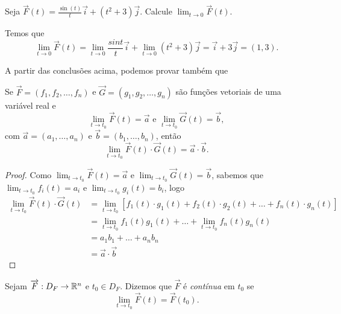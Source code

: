 \begin{example}
    Seja \(\overrightarrow{F}(t) = \frac{\sin(t)}{t}\overrightarrow{i} + (t^2 + 3)\overrightarrow{j}\). Calcule \(\lim_{t\to 0} \overrightarrow{F}(t)\).

    Temos que \[\lim_{t\to 0}\overrightarrow{F}(t) = \lim_{t\to 0} \frac{sin t}{t}\overrightarrow{i} + \lim_{t\to 0} (t^2 + 3)\overrightarrow{j} = \overrightarrow{i} + 3\overrightarrow{j} = (1,3).\]
\end{example}

A partir das conclusões acima, podemos provar também que

\begin{proposition}
    Se \(\overrightarrow{F} = (f_1,f_2,\dots,f_n)\) e \(\overrightarrow{G} = (g_1,g_2,\dots,g_n)\) são funções vetoriais de uma variável real e \[\lim_{t\to t_0} \overrightarrow{F}(t) = \overrightarrow{a} \text{ e } \lim_{t\to t_0} \overrightarrow{G}(t) = \overrightarrow{b},\] com \(\overrightarrow{a} = (a_1,\dots,a_n)\) e \(\overrightarrow{b} = (b_1,\dots,b_n)\), então \[\lim_{t\to t_0} \overrightarrow{F}(t) \cdot \overrightarrow{G}(t) = \overrightarrow{a}\cdot\overrightarrow{b}.\]
\end{proposition}

\begin{proof}
    Como \(\lim_{t\to t_0} \overrightarrow{F}(t) = \overrightarrow{a}\) e \(\lim_{t\to t_0} \overrightarrow{G}(t) = \overrightarrow{b}\), sabemos que \(\lim_{t\to t_0} f_i(t) = a_i\) e \(\lim_{t\to t_0} g_i(t) = b_i\), logo
        \begin{align*}
            \lim_{t\to t_0} \overrightarrow{F}(t) \cdot \overrightarrow{G}(t)
                & = \lim_{t\to t_0} \left[ f_1(t)\cdot g_1(t) + f_2(t)\cdot g_2(t) + \dots + f_n(t) \cdot g_n(t) \right] \\
                & = \lim_{t\to t_0} f_1(t)g_1(t) + \dots + \lim_{t\to t_0} f_n(t) g_n(t) \\
                & = a_1 b_1 + \dots + a_n b_n \\
                & = \overrightarrow{a}\cdot\overrightarrow{b}
        \end{align*}
\end{proof}

\begin{definition}\label{Funções vetorias!Continuidade}
    Sejam \(\overrightarrow{F}:D_F\to\mathbb{R}^n\) e \(t_0\in D_F\). Dizemos que \(\overrightarrow{F}\) é \textit{contínua} em \(t_0\) se \[\lim_{t\to t_0} \overrightarrow{F}(t) = \overrightarrow{F}(t_0).\]
\end{definition}

